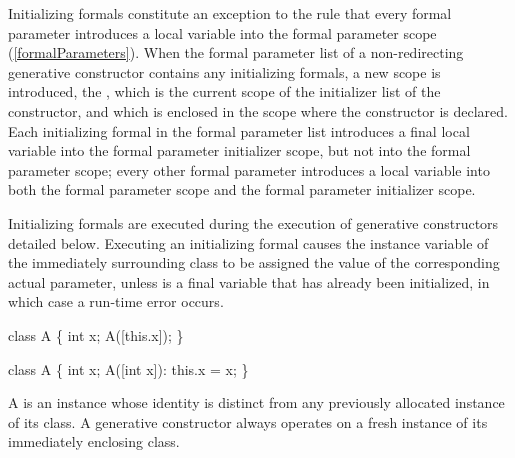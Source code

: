 \documentclass[makeidx]{article}
\begin{document}
\LMHash{}%
Initializing formals constitute an exception to the rule that
every formal parameter introduces a local variable into
the formal parameter scope (\ref{formalParameters}).
When the formal parameter list of a non-redirecting generative constructor
contains any initializing formals, a new scope is introduced, the
,
which is the current scope of the initializer list of the constructor,
and which is enclosed in the scope where the constructor is declared.
Each initializing formal in the formal parameter list introduces a final local variable into the formal parameter initializer scope, but not into the formal parameter scope; every other formal parameter introduces a local variable into both the formal parameter scope and the formal parameter initializer scope.


\LMHash{}%
Initializing formals are executed during the execution of generative constructors detailed below.
Executing an initializing formal  causes the instance variable \id{} of the immediately surrounding class to be assigned the value of the corresponding actual parameter,
unless \id{} is a final variable that has already been initialized, in which case a run-time error occurs.


\begin{dartCode}
class A \{
  int x;
  A([this.x]);
\}
\end{dartCode}


\begin{dartCode}
class A \{
  int x;
  A([int x]): this.x = x;
\}
\end{dartCode}

\LMHash{}%
A  is an instance whose identity is distinct from any previously allocated instance of its class.
A generative constructor always operates on a fresh instance of its immediately enclosing class.
\end{document}
